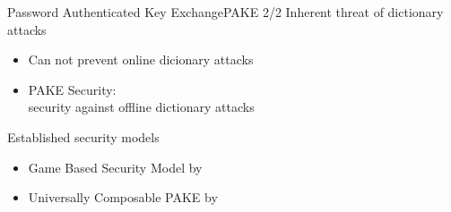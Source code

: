 \documentclass[notes,xcolor=dvipsnames]{beamer}
\begin{document}
\begin{frame}{Password Authenticated Key Exchange}{PAKE 2/2}
	Inherent threat of dictionary attacks
	\begin{itemize}
		\item Can not prevent online dicionary attacks
		\item PAKE Security:\\ \alert{security against offline dictionary attacks}
	\end{itemize}
	
	\vspace*{2em}
	Established security models
	\begin{itemize}
		\item Game Based Security Model by \cite{Bellare2000}%
		\item Universally Composable PAKE by \cite{Canetti2005}%
	\end{itemize}
\end{frame}
\end{document}
